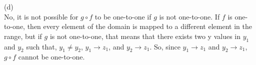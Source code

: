 \documentclass[12pt, letterpaper, twoside]{article}
\begin{document}
\break
\noindent(d)\\
No, it is not possible for $g \circ f$ to be one-to-one if $g$ is not one-to-one. If $f$ is one-to-one, then every element of the domain is mapped to a different element in the range, but if $g$ is not one-to-one, that means that there exists two y values in $y_{1}$ and $y_{2}$ such that, $y_{1} \neq y_{2}$, $y_{1} \to z_{1}$, and $y_{2} \to z_{1}$. So, since $y_{1} \to z_{1}$ and $y_{2} \to z_{1}$, $g \circ f$ cannot be one-to-one.
\end{document}
